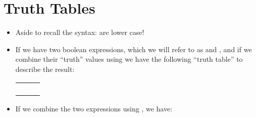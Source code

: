 \documentclass[letterpaper,10pt,english]{sphinxmanual}
\begin{document}
\section{Truth Tables}
\label{\detokenize{lecture_notes/lec11_conditionals2:truth-tables}}\begin{itemize}
\item {} 
Aside to recall the syntax:  are lower case!

\item {} 
If we have two boolean expressions, which we will refer to as 
and , and if we combine their “truth” values using  we
have the following “truth table” to describe the result:


\begin{savenotes}\sphinxattablestart
\centering
\begin{tabulary}{\linewidth}[t]{|T|T|T|}
\hline
\sphinxstyletheadfamily 
{}
&\sphinxstyletheadfamily 
{}
&\sphinxstyletheadfamily 
{}
\\
\hline
{}
&
&
\\
\hline
{}
&
&
\\
\hline
{}
&
&
\\
\hline
{}
&
&
\\
\hline
\end{tabulary}
\par
\sphinxattableend\end{savenotes}

\item {} 
If we combine the two expressions using , we have:



\end{itemize}
\end{document}
